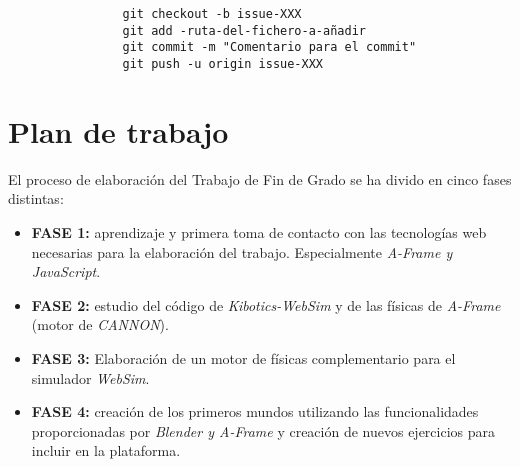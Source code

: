 \begin{verbatim}
                git checkout -b issue-XXX
                git add -ruta-del-fichero-a-añadir
                git commit -m "Comentario para el commit"
                git push -u origin issue-XXX
\end{verbatim}

\section{Plan de trabajo}
El proceso de elaboración del Trabajo de Fin de Grado se ha divido en cinco fases distintas:
\begin{itemize}
    \item \textbf{FASE 1:} aprendizaje y primera toma de contacto con las tecnologías web necesarias para la elaboración del trabajo. Especialmente \textit{A-Frame y JavaScript}.
    \item \textbf{FASE 2:} estudio del código de \textit{Kibotics-WebSim} y de las físicas de \textit{A-Frame} (motor de \textit{CANNON}).
    \item \textbf{FASE 3:} Elaboración de un motor de físicas complementario para el simulador \textit{WebSim}.
    \item \textbf{FASE 4:} creación de los primeros mundos utilizando las funcionalidades proporcionadas por \textit{Blender y A-Frame} y creación de nuevos ejercicios para incluir en la plataforma.
\end{itemize}